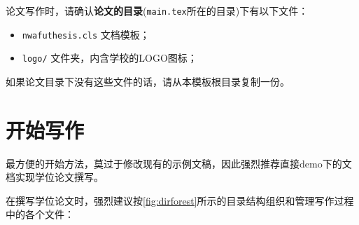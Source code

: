 论文写作时，请确认\textbf{论文的目录}(\verb|main.tex|所在的目录)下有以下文件：
\begin{itemize}
  \item \verb|nwafuthesis.cls| 文档模板；
  \item \verb|logo/| 文件夹，内含学校的LOGO图标；
\end{itemize}

如果论文目录下没有这些文件的话，请从本模板根目录复制一份。

\section{开始写作}

最方便的开始方法，莫过于修改现有的示例文稿，因此强烈推荐直接demo下的文
档实现学位论文撰写。

在撰写学位论文时，强烈建议按\autoref{fig:dirforest}所示的目录结构组织和管理写作过程中的各个文件：

